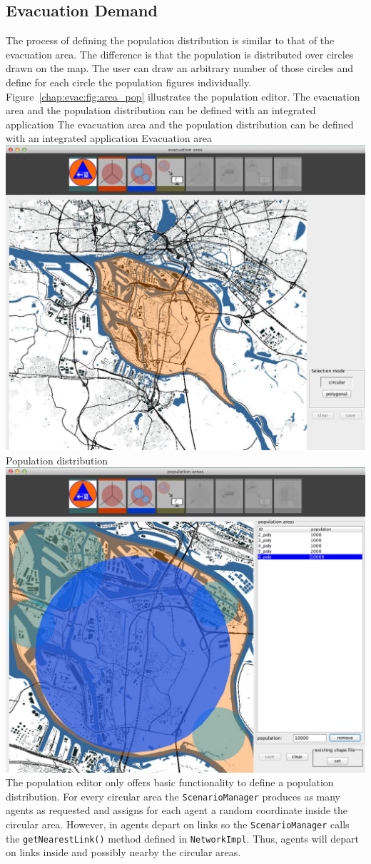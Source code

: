 \subsection{Evacuation Demand}
The process of defining the population distribution is similar to that of the evacuation area. The difference is that the population is distributed over circles drawn on the map. The user can draw an arbitrary number of those circles and define for each circle the population figures individually. Figure~\ref{chap:evac:fig:area_pop} illustrates the population editor. 
%
\createfigure%
{The evacuation area and the population distribution can be defined with an integrated  application}%
{The evacuation area and the population distribution can be defined with an integrated  application}%
{\label{chap:evac:fig:area_pop}}%
{%
  \createsubfigure%
  {Evacuation area}%
{\includegraphics[width=.475\linewidth]{extending/figures/Evacuation/evac_area_sel}}
  {}%
  {}%
  \createsubfigure%
  {Population distribution}%
{\includegraphics[width=.475\linewidth]{extending/figures/Evacuation/pop_sel}}
  {}%
  {}%
}%
  {}%
%
The population editor only offers basic functionality to define a population distribution. For every circular area the \lstinline|ScenarioManager| produces as many agents as requested and assigns for each agent a random coordinate inside the circular area. However, in  agents depart on links so the \lstinline|ScenarioManager| calls the \lstinline|getNearestLink()| method defined in \lstinline|NetworkImpl|. Thus, agents will depart on links inside and possibly nearby the circular areas. 


